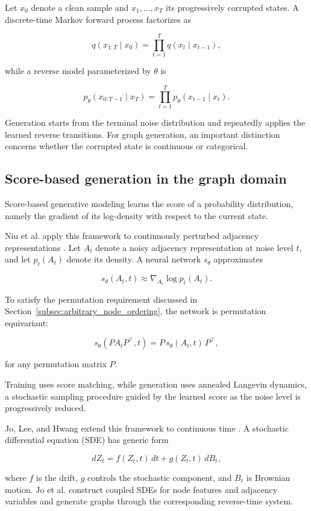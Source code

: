 Let \(x_0\) denote a clean sample and \(x_1,\ldots,x_T\) its progressively corrupted states. A discrete-time Markov forward process factorizes as

\[
q(x_{1:T}\mid x_0)
=
\prod_{t=1}^{T}
q(x_t\mid x_{t-1}),
\]

while a reverse model parameterized by \(\theta\) is

\[
p_\theta(x_{0:T-1}\mid x_T)
=
\prod_{t=1}^{T}
p_\theta(x_{t-1}\mid x_t).
\]

Generation starts from the terminal noise distribution and repeatedly applies the learned reverse transitions. For graph generation, an important distinction concerns whether the corrupted state is continuous or categorical.


\subsection{Score-based generation in the graph domain}
\label{subsec:rw_score_graph_generation}

Score-based generative modeling learns the score of a probability distribution, namely the gradient of its log-density with respect to the current state.

Niu et al. apply this framework to continuously perturbed adjacency representations \cite{niu2020permutation}. Let \(A_t\) denote a noisy adjacency representation at noise level \(t\), and let \(p_t(A_t)\) denote its density. A neural network \(s_\theta\) approximates

\[
s_\theta(A_t,t)
\approx
\nabla_{A_t}
\log p_t(A_t).
\]

To satisfy the permutation requirement discussed in Section~\ref{subsec:arbitrary_node_ordering}, the network is permutation equivariant:

\[
s_\theta
\left(
P A_t P^\top,t
\right)
=
P\,
s_\theta(A_t,t)\,
P^\top,
\]

for any permutation matrix \(P\).

Training uses score matching, while generation uses annealed Langevin dynamics, a stochastic sampling procedure guided by the learned score as the noise level is progressively reduced.

Jo, Lee, and Hwang extend this framework to continuous time \cite{jo2022score}. A stochastic differential equation (SDE) has generic form

\[
dZ_t
=
f(Z_t,t)\,dt
+
g(Z_t,t)\,dB_t,
\]

where \(f\) is the drift, \(g\) controls the stochastic component, and \(B_t\) is Brownian motion. Jo et al. construct coupled SDEs for node features and adjacency variables and generate graphs through the corresponding reverse-time system.


